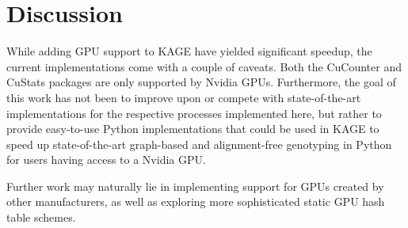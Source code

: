 \section*{Discussion}
While adding GPU support to KAGE have yielded significant speedup, the current implementations come with a couple of caveats.
Both the CuCounter and CuStats packages are only supported by Nvidia GPUs.
Furthermore, the goal of this work has not been to improve upon or compete with state-of-the-art implementations for the respective processes implemented here, but rather to provide easy-to-use Python implementations that could be used in KAGE to speed up state-of-the-art graph-based and alignment-free genotyping in Python for users having access to a Nvidia GPU.

Further work may naturally lie in implementing support for GPUs created by other manufacturers, as well as exploring more sophisticated static GPU hash table schemes.

